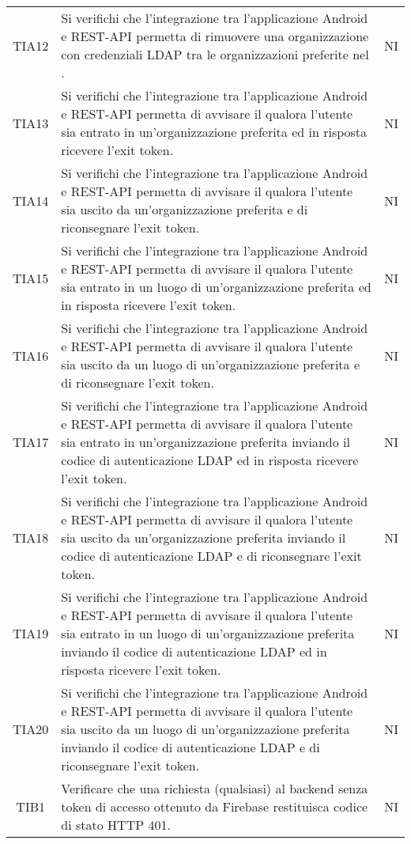 {\begin{longtable}{ c C{13cm} C{1cm}}
TIA12 & Si verifichi che l’integrazione tra l’applicazione Android e REST-API permetta di rimuovere una organizzazione con credenziali LDAP tra le organizzazioni preferite nel . & NI \\
TIA13 & Si verifichi che l’integrazione tra l’applicazione Android e REST-API permetta di avvisare il  qualora l'utente sia entrato in un'organizzazione preferita ed in risposta ricevere l'exit token. & NI \\
TIA14 & Si verifichi che l’integrazione tra l’applicazione Android e REST-API permetta di avvisare il  qualora l'utente sia uscito da un'organizzazione preferita e di riconsegnare l'exit token. & NI \\
TIA15 & Si verifichi che l’integrazione tra l’applicazione Android e REST-API permetta di avvisare il  qualora l'utente sia entrato in un luogo di un'organizzazione preferita ed in risposta ricevere l'exit token. & NI \\
TIA16 & Si verifichi che l’integrazione tra l’applicazione Android e REST-API permetta di avvisare il  qualora l'utente sia uscito da un luogo di un'organizzazione preferita e di riconsegnare l'exit token. & NI \\
TIA17 & Si verifichi che l’integrazione tra l’applicazione Android e REST-API permetta di avvisare il  qualora l'utente sia entrato in un'organizzazione preferita inviando il codice di autenticazione LDAP ed in risposta ricevere l'exit token. & NI \\
TIA18 & Si verifichi che l’integrazione tra l’applicazione Android e REST-API permetta di avvisare il  qualora l'utente sia uscito da un'organizzazione preferita inviando il codice di autenticazione LDAP e di riconsegnare l'exit token. & NI \\
TIA19 & Si verifichi che l’integrazione tra l’applicazione Android e REST-API permetta di avvisare il  qualora l'utente sia entrato in un luogo di un'organizzazione preferita inviando il codice di autenticazione LDAP ed in risposta ricevere l'exit token. & NI \\
TIA20 & Si verifichi che l’integrazione tra l’applicazione Android e REST-API permetta di avvisare il  qualora l'utente sia uscito da un luogo di un'organizzazione preferita inviando il codice di autenticazione LDAP e di riconsegnare l'exit token. & NI \\
TIB1 & Verificare che una richiesta (qualsiasi) al backend senza token di accesso ottenuto da Firebase restituisca codice di stato HTTP 401. & NI \\

\end{longtable}}
